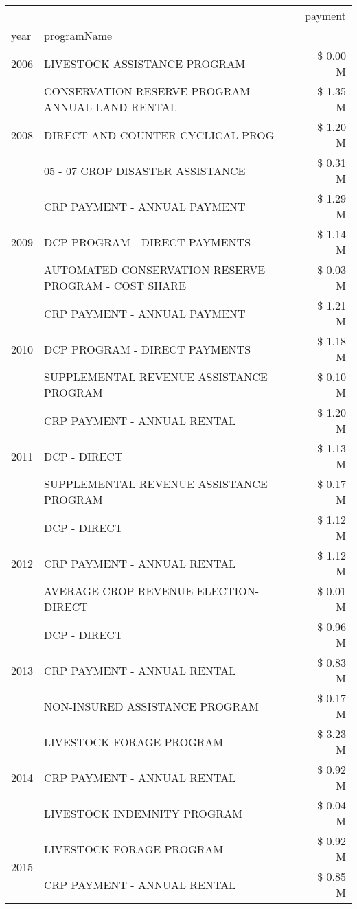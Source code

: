 \begin{tabular}{llr}
\toprule
 &  & payment \\
year & programName &  \\
\midrule
2006 & LIVESTOCK ASSISTANCE PROGRAM & \$ 0.00 M \\
\cline{1-3}
\multirow[t]{3}{*}{2008} & CONSERVATION RESERVE PROGRAM - ANNUAL LAND RENTAL & \$ 1.35 M \\
 & DIRECT AND COUNTER CYCLICAL PROG & \$ 1.20 M \\
 & 05 - 07 CROP DISASTER ASSISTANCE & \$ 0.31 M \\
\cline{1-3}
\multirow[t]{3}{*}{2009} & CRP PAYMENT - ANNUAL PAYMENT & \$ 1.29 M \\
 & DCP PROGRAM - DIRECT PAYMENTS & \$ 1.14 M \\
 & AUTOMATED CONSERVATION RESERVE PROGRAM - COST SHARE & \$ 0.03 M \\
\cline{1-3}
\multirow[t]{3}{*}{2010} & CRP PAYMENT - ANNUAL PAYMENT & \$ 1.21 M \\
 & DCP PROGRAM - DIRECT PAYMENTS & \$ 1.18 M \\
 & SUPPLEMENTAL REVENUE ASSISTANCE PROGRAM & \$ 0.10 M \\
\cline{1-3}
\multirow[t]{3}{*}{2011} & CRP PAYMENT - ANNUAL RENTAL & \$ 1.20 M \\
 & DCP - DIRECT & \$ 1.13 M \\
 & SUPPLEMENTAL REVENUE ASSISTANCE PROGRAM & \$ 0.17 M \\
\cline{1-3}
\multirow[t]{3}{*}{2012} & DCP - DIRECT & \$ 1.12 M \\
 & CRP PAYMENT - ANNUAL RENTAL & \$ 1.12 M \\
 & AVERAGE CROP REVENUE ELECTION-DIRECT & \$ 0.01 M \\
\cline{1-3}
\multirow[t]{3}{*}{2013} & DCP - DIRECT & \$ 0.96 M \\
 & CRP PAYMENT - ANNUAL RENTAL & \$ 0.83 M \\
 & NON-INSURED ASSISTANCE PROGRAM & \$ 0.17 M \\
\cline{1-3}
\multirow[t]{3}{*}{2014} & LIVESTOCK FORAGE PROGRAM & \$ 3.23 M \\
 & CRP PAYMENT - ANNUAL RENTAL & \$ 0.92 M \\
 & LIVESTOCK INDEMNITY PROGRAM & \$ 0.04 M \\
\cline{1-3}
\multirow[t]{3}{*}{2015} & LIVESTOCK FORAGE PROGRAM & \$ 0.92 M \\
 & CRP PAYMENT - ANNUAL RENTAL & \$ 0.85 M \\

\end{tabular}

